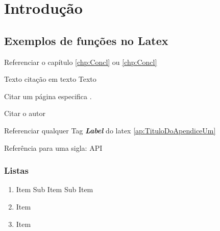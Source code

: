 \chapter{Introdução}
\label{chp:introduction}

\lipsum[1]

\section{Exemplos de funções no Latex}

Referenciar o capítulo \ref{chp:Concl}
ou \autoref{chp:Concl} 


Texto citação em texto  Texto

Citar um página especifica \cite[p. 16]{livro1}.

Citar o autor \citeauthor{artigo_2010}

Referenciar qualquer Tag \textit{\textbf{Label}} do latex \autoref{ap:TituloDoApendiceUm} 

Referência para uma sigla: \acs{API} 

\subsection{Listas}


\begin{enumerate}[noitemsep]
	\item Item 
	\subitem Sub Item
	\subitem Sub Item 
	\item Item 
	\item Item 
\end{enumerate}	

\lipsum[1-4]